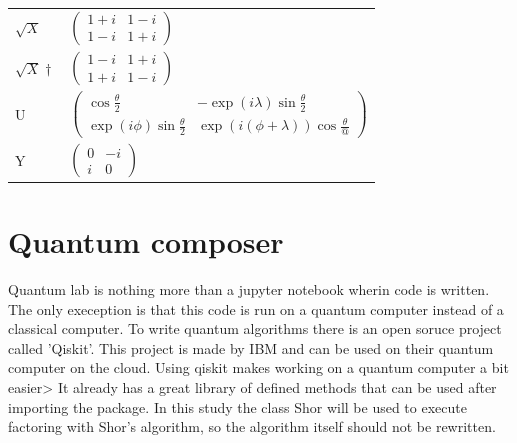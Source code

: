 \begin{table}[]
\begin{tabular}{l|l}
        $\sqrt{X}$                        & $\begin{pmatrix} 1+i&1-i                                                  \\ 1-i&1+i                                                                                                                                                                            \end{pmatrix}$ \\
        $\sqrt{X}\dagger$                 & $\begin{pmatrix} 1-i&1+i                                                  \\ 1+i&1-i                                                                                                                                                                            \end{pmatrix}$ \\
        U                                 & $\begin{pmatrix} \cos\frac{\theta}{2}&-\exp(i\lambda)\sin\frac{\theta}{2} \\ \exp(i\phi)\sin\frac{\theta}{2}&\exp(i(\phi+\lambda))\cos\frac{\theta}{@}                                                                                                          \end{pmatrix}$ \\
        Y                                 & $\begin{pmatrix} 0&-i \\ i&0                                                                                                                                                                                                                                    \end{pmatrix}$                                   
        \end{tabular}
\end{table}

\section{Quantum composer}
\label{sec:Qlab}
Quantum lab is nothing more than a jupyter notebook wherin code is written. The only exeception is that this code is run on a quantum computer instead of a classical computer.
To write quantum algorithms there is an open soruce project called 'Qiskit'. This project is made by IBM and can be used on their quantum computer on the cloud. Using qiskit makes working on a quantum computer a bit easier>
It already has a great library of defined methods that can be used after importing the package. In this study the class Shor will be used to execute factoring with Shor's algorithm, so the algorithm itself should not be rewritten.
